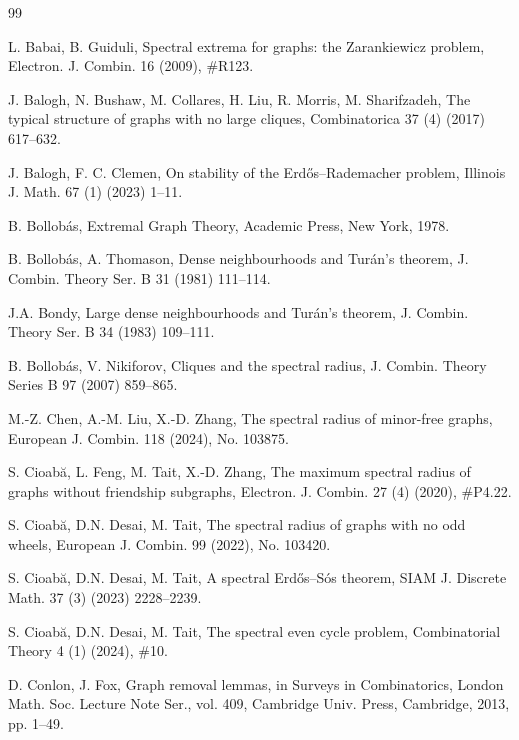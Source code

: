 \documentclass[11pt]{article}
\begin{document}
\frenchspacing
\begin{thebibliography}{99}

L. Babai, B. Guiduli, 
Spectral extrema for graphs: the Zarankiewicz problem, 
Electron. J. Combin. 16 (2009), \#R123. 

J. Balogh, N. Bushaw, M. Collares, H. Liu, R. Morris, M. Sharifzadeh, 
 The typical structure of graphs with no large cliques, 
 Combinatorica 37 (4) (2017)  617--632.
 

 J. Balogh, F. C. Clemen, 
 On stability of the Erd\H{o}s--Rademacher problem, 
 Illinois J. Math. 67 (1) (2023) 1--11.
 
 
B. Bollob\'as, 
Extremal Graph Theory, 
Academic Press, New York, 1978. 

B. Bollob\'as, A. Thomason, 
Dense neighbourhoods and Tur\'{a}n's theorem, 
J. Combin. Theory Ser. B 31 (1981) 111--114. 

J.A. Bondy, 
Large dense neighbourhoods and Tur\'{a}n's theorem, 
J. Combin. Theory Ser. B 34 (1983) 109--111.  

B. Bollob\'{a}s, V. Nikiforov, 
Cliques and the spectral radius, 
J. Combin. Theory Series B 97 (2007) 859--865. 

M.-Z. Chen, A.-M. Liu, X.-D. Zhang, 
The spectral radius of minor-free graphs, 
European J. Combin. 118 (2024), No. 103875. 

 S. Cioab\u{a}, L. Feng, M. Tait, X.-D. Zhang, 
The maximum spectral radius of graphs without friendship subgraphs, 
 Electron. J. Combin. 27 (4) (2020), \#P4.22.
 
 S. Cioab\u{a}, D.N. Desai, M. Tait, 
 The spectral radius of graphs with no odd wheels, 
 European J. Combin. 99 (2022), No. 103420.
 
 
  S. Cioab\u{a}, D.N. Desai, M. Tait,
 A spectral Erd\H{o}s--S\'{o}s theorem,
 SIAM J. Discrete Math. 37 (3) (2023) 2228--2239.
 
S. Cioab\u{a}, D.N. Desai, M. Tait, 
  The spectral even cycle problem, 
  Combinatorial Theory 4 (1) (2024), \#10. 
  
D. Conlon, J. Fox, Graph removal lemmas, in Surveys in Combinatorics, London Math. Soc. Lecture Note Ser., vol. 409, Cambridge Univ. Press, Cambridge, 2013, pp. 1--49.
  


\end{thebibliography}
\end{document}
